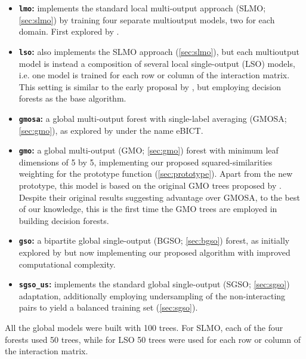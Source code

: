\begin{itemize}
    \item \textbf{\texttt{lmo}:} implements the standard local multi-output approach (SLMO; \autoref{sec:slmo}) by training four separate multioutput models, two for each domain. First explored by \textcite{schrynemackers2015classifying}.
    \item \textbf{\texttt{lso}:} also implements the SLMO approach (\autoref{sec:slmo}), but each multioutput model is instead a composition of several local single-output (LSO) models, i.e. one model is trained for each row or column of the interaction matrix. This setting is similar to the early proposal by \textcite{bleakley2009supervised}, but employing decision forests as the base algorithm.
    \item \textbf{\texttt{gmosa}:} a global multi-output forest with single-label averaging (GMOSA; \autoref{sec:gmo}), as explored by \textcite{pliakos2019network} under the name eBICT.
    \item \textbf{\texttt{gmo}:} a global multi-output (GMO; \autoref{sec:gmo}) forest with minimum leaf dimensions of 5 by 5, implementing our proposed squared-similarities weighting for the prototype function (\autoref{sec:prototype}). Apart from the new prototype, this model is based on the original GMO trees proposed by \textcite{pliakos2018global}. Despite their original results suggesting advantage over GMOSA, to the best of our knowledge, this is the first time the GMO trees are employed in building decision forests.  %
    \item \textbf{\texttt{gso}:} a bipartite global single-output (BGSO; \autoref{sec:bgso}) forest, as initially explored by \textcite{schrynemackers2015classifying} but now implementing our proposed algorithm with improved computational complexity.
    \item \textbf{\texttt{sgso\_us}:} implements the standard global single-output (SGSO; \autoref{sec:sgso}) adaptation, additionally employing undersampling of the non-interacting pairs to yield a balanced training set (\autoref{sec:sgso}).  %
\end{itemize}

All the global models were built with 100 trees. For SLMO, each of the four forests used 50 trees, while for LSO 50 trees were used for each row or column of the interaction matrix.

